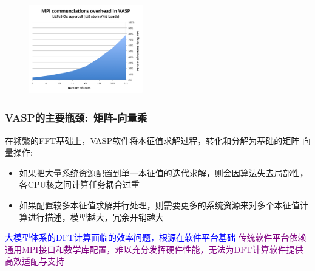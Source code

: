 {\begin{figure}[h!]
\begin{minipage}[t]{0.49\textwidth}
\end{minipage}
\begin{minipage}[b]{0.49\textwidth}
{\fontsize{7.5pt}{5.2pt}}
\includegraphics[height=1.55in,width=1.95in,viewport=0 0 240 200,clip]{Figures/VASP-mpi-Li128.png}
\end{minipage}
\label{ABINIT_vs_VASP-3}
\end{figure} 

}

\begin{frame}
	\frametitle{\textrm{VASP}的主要瓶颈:~矩阵-向量乘}
在频繁的\textrm{FFT}基础上，\textrm{VASP}软件将本征值求解过程，转化和分解为基础的矩阵-向量操作:\\
{\fontsize{7.2pt}{5.2pt}}
	\begin{itemize}
		\item 如果把大量系统资源配置到单一本征值的迭代求解，则会因算法失去局部性，各\textrm{CPU}核之间计算任务耦合过重\\
	{\fontsize{7.2pt}{5.2pt}\selectfont{可能造成系统过载}}
		\item 如果配置较多本征值求解并行处理，则需要更多的系统资源来对多个本征值计算进行描述，模型越大，冗余开销越大\\
			{\fontsize{7.2pt}{5.2pt}\selectfont{可能影响软件的实用性，甚至超过了现有计算机集群的处理极限}}
	\end{itemize}
	{\textcolor{blue}{大模型体系的\textrm{DFT}计算面临的效率问题，根源在软件平台基础}}
	\vskip 2pt
	{\textcolor{purple}{传统软件平台依赖通用\textrm{MPI}接口和数学库配置，难以充分发挥硬件性能，无法为\textrm{DFT}计算软件提供高效适配与支持}}
\end{frame}

